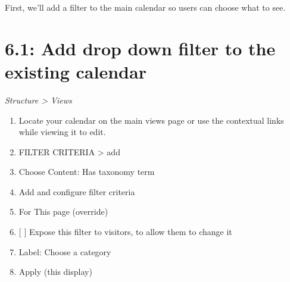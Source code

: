 \documentclass[letterpaper,10pt,english]{sphinxmanual}
\begin{document}
First, we'll add a filter to the main calendar so users can choose what to see.


\section{6.1: Add drop down filter to the existing calendar}
\label{event_calendar:add-drop-down-filter-to-the-existing-calendar}
\emph{Structure \textgreater{} Views}
\begin{enumerate}
\item {} 
Locate your calendar on the main views page or use the contextual links while viewing it to edit.

\item {} 
FILTER CRITERIA \textgreater{} add

\item {} 
Choose Content: Has taxonomy term

\item {} 
Add and configure filter criteria

\item {} 
For This page (override)

\item {} 
{[}  {]} Expose this filter to visitors, to allow them to change it

\item {} 
Label: Choose a category

\item {} 
Apply (this display)

\end{enumerate}
\end{document}
